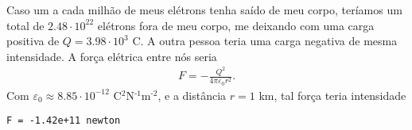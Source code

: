 \documentclass[11pt]{article}
\begin{document}
Caso um a cada milhão de meus elétrons tenha saído de meu corpo,
teríamos um total de \(2.48\cdot10^{22}\) elétrons fora de meu corpo, me
deixando com uma carga positiva de \(Q=3.98\cdot10^3\) C. A outra pessoa
teria uma carga negativa de mesma intensidade. A força elétrica entre
nós seria
\begin{align*}
  F = -\frac{Q^2}{4\pi\varepsilon_0r^{2}}.
\end{align*}
Com \(\varepsilon_0\approx8.85\cdot10^{-12}\) C\(^{\text{2}}\)N\(^{\text{-1}}\)m\(^{\text{-2}}\), e a
distância \(r=1\) km, tal força teria intensidade
\begin{verbatim}
F = -1.42e+11 newton
\end{verbatim}
\end{document}
